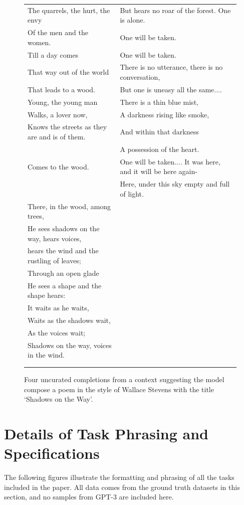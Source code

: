 \documentclass{article}
\begin{document}
\begin{figure}
{\begin{center}
\begin{tabular}{l l}
The quarrels, the hurt, the envy & But hears no roar of the forest. One is alone.\\
Of the men and the women. & One will be taken.\\
Till a day comes & One will be taken.\\
That way out of the world & There is no utterance, there is no conversation,\\
That leads to a wood. & But one is uneasy all the same....\\
Young, the young man & There is a thin blue mist,\\
Walks, a lover now, & A darkness rising like smoke,\\
Knows the streets as they are and is of them. & And within that darkness\\
 & A possession of the heart.\\
Comes to the wood. & One will be taken.... It was here, and it will be here again-\\
 & Here, under this sky empty and full of light.\\
There, in the wood, among trees, & \\
He sees shadows on the way, hears voices, & \\
hears the wind and the rustling of leaves; & \\
Through an open glade & \\
He sees a shape and the shape hears: & \\
It waits as he waits, & \\
Waits as the shadows wait, & \\
As the voices wait; & \\
Shadows on the way, voices in the wind. & \\
 & \\
\\ \bottomrule \end{tabular}\end{center} }  
\caption{Four uncurated completions from a context suggesting the model compose a poem in the style of Wallace Stevens with the title `Shadows on the Way'.}  
 \label{sample:FakeStevensPoem}  
 \end{figure}
\clearpage
\newpage
\section{Details of Task Phrasing and Specifications}
\label{appendix:task_phrasing}
The following figures illustrate the formatting and phrasing of all the tasks included in the paper. All data comes from the ground truth datasets in this section, and no samples from GPT-3 are included here.
\end{document}
